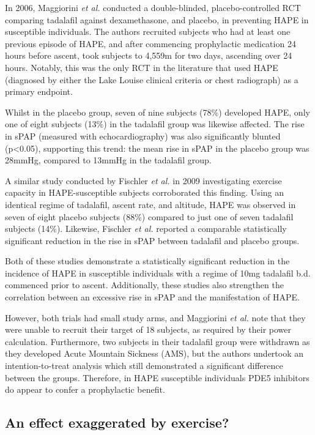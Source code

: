 \documentclass[10pt,a4paper]{article}
\begin{document}
In 2006, Maggiorini \emph{et al.} conducted a double-blinded, placebo-controlled RCT comparing tadalafil against dexamethasone, and placebo, in preventing HAPE in susceptible individuals.\cite{Maggiorini:2006kz} The authors recruited subjects who had at least one previous episode of HAPE, and after commencing prophylactic medication 24 hours before ascent, took subjects to 4,559m for two days, ascending over 24 hours. Notably, this was the only RCT in the literature that used HAPE (diagnosed by either the Lake Louise clinical criteria\cite{Sutton:1991wx} or chest radiograph) as a primary endpoint.

Whilst in the placebo group, seven of nine subjects (78\%) developed HAPE, only one of eight subjects (13\%) in the tadalafil group was likewise affected. The rise in sPAP (measured with echocardiography) was also significantly blunted (p<0.05), supporting this trend: the mean rise in sPAP in the placebo group was 28mmHg, compared to 13mmHg in the tadalafil group.

A similar study conducted by Fischler \emph{et al.} in 2009 investigating exercise capacity in HAPE-susceptible subjects corroborated this finding. Using an identical regime of tadalafil, ascent rate, and altitude, HAPE was observed in seven of eight placebo subjects (88\%) compared to just one of seven tadalafil subjects (14\%). Likewise, Fischler \emph{et al.} reported a comparable statistically significant reduction in the rise in sPAP between tadalafil and placebo groups.

Both of these studies demonstrate a statistically significant reduction in the incidence of HAPE in susceptible individuals with a regime of 10mg tadalafil b.d. commenced prior to ascent. Additionally, these studies also strengthen the correlation between an excessive rise in sPAP and the manifestation of HAPE.

However, both trials had small study arms, and Maggiorini \emph{et al.} note that they were unable to recruit their target of 18 subjects, as required by their power calculation. Furthermore, two subjects in their tadalafil group were withdrawn as they developed Acute Mountain Sickness (AMS), but the authors undertook an intention-to-treat analysis which still demonstrated a significant difference between the groups. Therefore, in HAPE susceptible individuals PDE5 inhibitors do appear to confer a prophylactic benefit.

\subsection*{An effect exaggerated by exercise?}
\end{document}
